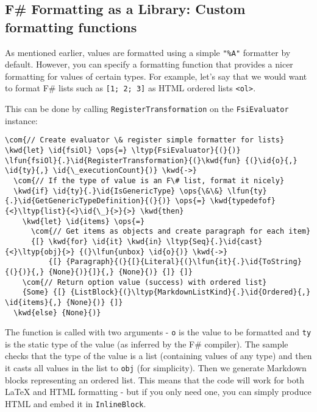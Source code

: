 \documentclass{article}
\newcommand{\id}[1]{\textcolor{black}{#1}}
\newcommand{\com}[1]{\textcolor{officegreen}{#1}}
\newcommand{\kwd}[1]{\textcolor{navy}{#1}}
\newcommand{\ops}[1]{\textcolor{purple}{#1}}
\begin{document}
\subsection*{F\# Formatting as a Library: Custom formatting functions}



As mentioned earlier, values are formatted using a simple \texttt{"\%A"} formatter by default.
However, you can specify a formatting function that provides a nicer formatting for values
of certain types. For example, let's say that we would want to format F\# lists such as
\texttt{[1; 2; 3]} as HTML ordered lists \texttt{<ol>}.


This can be done by calling \texttt{RegisterTransformation} on the \texttt{FsiEvaluator} instance:
\begin{Verbatim}[commandchars=\\\{\}]
\com{// Create evaluator \& register simple formatter for lists}
\kwd{let} \id{fsiOl} \ops{=} \ltyp{FsiEvaluator}{(}{)}
\lfun{fsiOl}{.}\id{RegisterTransformation}{(}\kwd{fun} {(}\id{o}{,} \id{ty}{,} \id{\_executionCount}{)} \kwd{->}
  \com{// If the type of value is an F\# list, format it nicely}
  \kwd{if} \id{ty}{.}\id{IsGenericType} \ops{\&\&} \lfun{ty}{.}\id{GetGenericTypeDefinition}{(}{)} \ops{=} \kwd{typedefof}{<}\ltyp{list}{<}\id{\_}{>}{>} \kwd{then}
    \kwd{let} \id{items} \ops{=} 
      \com{// Get items as objects and create paragraph for each item}
      {[} \kwd{for} \id{it} \kwd{in} \ltyp{Seq}{.}\id{cast}{<}\ltyp{obj}{>} {(}\lfun{unbox} \id{o}{)} \kwd{->} 
          {[} {Paragraph}{(}{[}{Literal}{(}\lfun{it}{.}\id{ToString}{(}{)}{,} {None}{)}{]}{,} {None}{)} {]} {]}
    \com{// Return option value (success) with ordered list}
    {Some} {[} {ListBlock}{(}\ltyp{MarkdownListKind}{.}\id{Ordered}{,} \id{items}{,} {None}{)} {]}
  \kwd{else} {None}{)}
\end{Verbatim}



The function is called with two arguments - \texttt{o} is the value to be formatted and \texttt{ty}
is the static type of the value (as inferred by the F\# compiler). The sample checks
that the type of the value is a list (containing values of any type) and then it
casts all values in the list to \texttt{obj} (for simplicity). Then we generate Markdown
blocks representing an ordered list. This means that the code will work for both
LaTeX and HTML formatting - but if you only need one, you can simply produce HTML and
embed it in \texttt{InlineBlock}.
\end{document}
